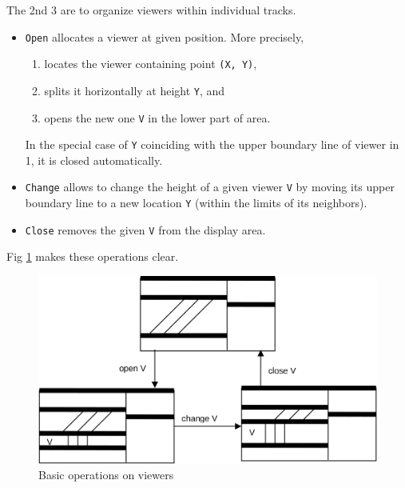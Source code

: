 The 2nd 3 are to organize viewers within individual tracks.
\begin{itemize}
  \item \verb|Open| allocates a viewer at given position.  More precisely,
    \begin{enumerate}
      \item locates the viewer containing point \verb|(X, Y)|,
      \item splits it horizontally at height \verb|Y|, and
      \item opens the new one \verb|V| in the lower part of area.
    \end{enumerate}
    In the special case of \verb|Y| coinciding with the upper boundary line of viewer in 1,
    it is closed automatically.
  \item \verb|Change| allows to change the height of a given viewer \verb|V|
    by moving its upper boundary line to a new location \verb|Y| (within the limits of its neighbors).
  \item \verb|Close| removes the given \verb|V| from the display area.
\end{itemize}
Fig \ref{fig:operation} makes these operations clear.
\begin{figure}[h!]
  \centering
  \includegraphics[width=.75\textwidth]{i/8}
  \caption{Basic operations on viewers}
  \label{fig:operation}
\end{figure}

